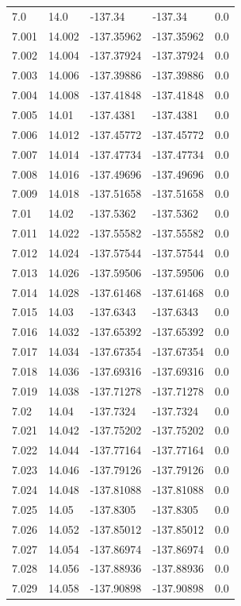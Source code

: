 \begin{tabular}{lllll}
7.0 & 14.0 & -137.34 & -137.34 & 0.0 \\
7.001 & 14.002 & -137.35962 & -137.35962 & 0.0 \\
7.002 & 14.004 & -137.37924 & -137.37924 & 0.0 \\
7.003 & 14.006 & -137.39886 & -137.39886 & 0.0 \\
7.004 & 14.008 & -137.41848 & -137.41848 & 0.0 \\
7.005 & 14.01 & -137.4381 & -137.4381 & 0.0 \\
7.006 & 14.012 & -137.45772 & -137.45772 & 0.0 \\
7.007 & 14.014 & -137.47734 & -137.47734 & 0.0 \\
7.008 & 14.016 & -137.49696 & -137.49696 & 0.0 \\
7.009 & 14.018 & -137.51658 & -137.51658 & 0.0 \\
7.01 & 14.02 & -137.5362 & -137.5362 & 0.0 \\
7.011 & 14.022 & -137.55582 & -137.55582 & 0.0 \\
7.012 & 14.024 & -137.57544 & -137.57544 & 0.0 \\
7.013 & 14.026 & -137.59506 & -137.59506 & 0.0 \\
7.014 & 14.028 & -137.61468 & -137.61468 & 0.0 \\
7.015 & 14.03 & -137.6343 & -137.6343 & 0.0 \\
7.016 & 14.032 & -137.65392 & -137.65392 & 0.0 \\
7.017 & 14.034 & -137.67354 & -137.67354 & 0.0 \\
7.018 & 14.036 & -137.69316 & -137.69316 & 0.0 \\
7.019 & 14.038 & -137.71278 & -137.71278 & 0.0 \\
7.02 & 14.04 & -137.7324 & -137.7324 & 0.0 \\
7.021 & 14.042 & -137.75202 & -137.75202 & 0.0 \\
7.022 & 14.044 & -137.77164 & -137.77164 & 0.0 \\
7.023 & 14.046 & -137.79126 & -137.79126 & 0.0 \\
7.024 & 14.048 & -137.81088 & -137.81088 & 0.0 \\
7.025 & 14.05 & -137.8305 & -137.8305 & 0.0 \\
7.026 & 14.052 & -137.85012 & -137.85012 & 0.0 \\
7.027 & 14.054 & -137.86974 & -137.86974 & 0.0 \\
7.028 & 14.056 & -137.88936 & -137.88936 & 0.0 \\
7.029 & 14.058 & -137.90898 & -137.90898 & 0.0 \\

\end{tabular}
